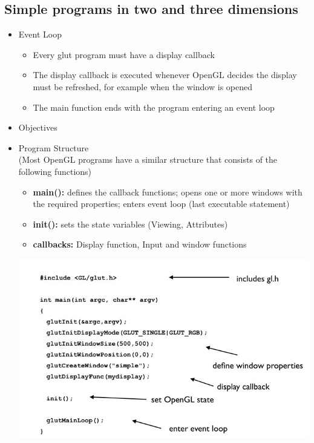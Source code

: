 \documentclass[11pt,a4paper]{article}
\begin{document}
	\subsection{Simple programs in two and three dimensions}
		\begin{itemize}
			\item  Event Loop
			\begin{itemize}
				\item Every glut program must have a display callback
				\item The display callback is executed whenever OpenGL decides the display must be refreshed, for example when the window is opened
				\item The main function ends with the program entering an event loop
			\end{itemize}
			\item Objectives
			\item Program Structure \\
				(Most OpenGL programs have a similar structure that consists of	the following functions)
				\begin{itemize}
					\item \textbf{main():} defines the callback functions; opens one or more windows with the required properties; enters event loop (last executable statement)	
					\item \textbf{init():} sets the state variables	(Viewing, Attributes)
					\item \textbf{callbacks:} Display function, Input and window functions
				\end{itemize}
			\begin{center}
				\includegraphics[scale=0.5]{pictures/exsampleglut.jpg}
			\end{center}

\end{itemize}
\end{document}
